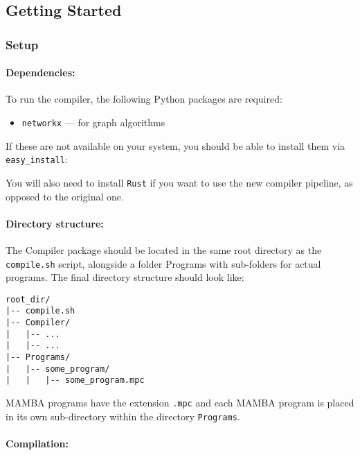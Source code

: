 \label{sec:compiler}

\subsection{Getting Started}

\subsubsection{Setup}

\paragraph{Dependencies:}

To run the compiler, the following Python packages are required:
\begin{itemize}
\item \texttt{networkx} --- for graph algorithms
\end{itemize}
If these are not available on your system, you should be able to install them
via \texttt{easy\_install}:


You will also need to install \texttt{Rust} if you want to use the
new compiler pipeline, as opposed to the original one.

\paragraph{Directory structure:}

The Compiler package should be located in the same root directory as the
\texttt{compile.sh} script, alongside a folder Programs with sub-folders for
actual programs. The final directory structure should look like:

\begin{lstlisting}[language={}]
root_dir/
|-- compile.sh
|-- Compiler/
|   |-- ...
|   |-- ...
|-- Programs/
|   |-- some_program/
|   |   |-- some_program.mpc
\end{lstlisting}
MAMBA programs have the extension \verb+.mpc+ and each MAMBA
program is placed in its own sub-directory within
the directory \verb+Programs+.

\paragraph{Compilation:}

